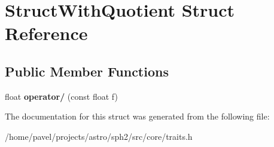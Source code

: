 \hypertarget{structStructWithQuotient}{}\section{Struct\+With\+Quotient Struct Reference}
\label{structStructWithQuotient}
\subsection*{Public Member Functions}
\begin{DoxyCompactItemize}
\item 
\hypertarget{structStructWithQuotient_a4972402ec4e7deae49316aaf7dfe6e7e}{}\label{structStructWithQuotient_a4972402ec4e7deae49316aaf7dfe6e7e} 
float {\bfseries operator/} (const float f)
\end{DoxyCompactItemize}


The documentation for this struct was generated from the following file\+:\begin{DoxyCompactItemize}
\item 
/home/pavel/projects/astro/sph2/src/core/traits.\+h\end{DoxyCompactItemize}

